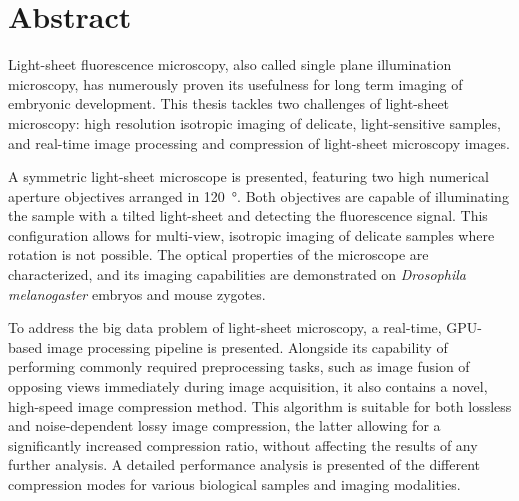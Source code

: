 
\chapter*{Abstract}
Light-sheet fluorescence microscopy, also called single plane illumination microscopy, has numerously proven its usefulness for long term imaging of embryonic development. This thesis tackles two challenges of light-sheet microscopy: high resolution isotropic imaging of delicate, light-sensitive samples, and real-time image processing and compression of light-sheet microscopy images.

A symmetric light-sheet microscope is presented, featuring two high numerical aperture objectives arranged in \SI{120}{\degree}. Both objectives are capable of illuminating the sample with a tilted light-sheet and detecting the fluorescence signal. This configuration allows for multi-view, isotropic imaging of delicate samples where rotation is not possible. The optical properties of the microscope are characterized, and its imaging capabilities are demonstrated on \textit{Drosophila melanogaster} embryos and mouse zygotes.

To address the big data problem of light-sheet microscopy, a real-time, GPU-based image processing pipeline is presented.
Alongside its capability of performing commonly required preprocessing tasks, such as image fusion of opposing views immediately during image acquisition, it also contains a novel, high-speed image compression method. This algorithm is suitable for both lossless and noise-dependent lossy image compression, the latter allowing for a significantly increased compression ratio, without affecting the results of any further analysis.
A detailed performance analysis is presented of the different compression modes for various biological samples and imaging modalities.







